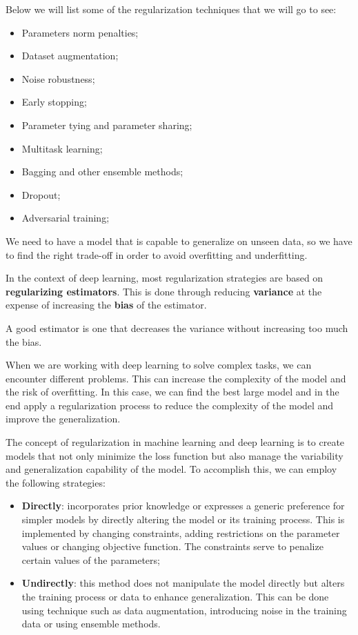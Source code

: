 Below we will list some of the regularization techniques that we will go to see:
\begin{itemize}
    \item Parameters norm penalties;
    \item Dataset augmentation;
    \item Noise robustness;
    \item Early stopping;
    \item Parameter tying and parameter sharing;
    \item Multitask learning;
    \item Bagging and other ensemble methods;
    \item Dropout;
    \item Adversarial training;
\end{itemize}

We need to have a model that is capable to generalize on unseen data, so we have
to find the right trade-off in order to avoid overfitting and underfitting.

In the context of deep learning, most regularization strategies are based on
\textbf{regularizing estimators}. This is done through reducing \textbf{variance}
at the expense of increasing the \textbf{bias} of the estimator.
\begin{note}
    A good estimator is one that decreases the variance without increasing too
    much the bias.
\end{note}

When we are working with deep learning to solve complex tasks, we can encounter
different problems. This can increase the complexity of the model and the risk of
overfitting. In this case, we can find the best large model and in the end apply
a regularization process to reduce the complexity of the model and improve the
generalization.

The concept of regularization in machine learning and deep learning is to create
models that not only minimize the loss function but also manage the variability
and generalization capability of the model. To accomplish this, we can employ the
following strategies:
\begin{itemize}
    \item \textbf{Directly}: incorporates prior knowledge or expresses a generic
          preference for simpler models by directly altering the model or its
          training process. This is implemented by changing constraints, adding
          restrictions on the parameter values or changing objective function.
          The constraints serve to penalize certain values of the parameters;
    \item \textbf{Undirectly}: this method does not manipulate the model directly
          but alters the training process or data to enhance generalization. This
          can be done using technique such as data augmentation, introducing noise
          in the training data or using ensemble methods.
\end{itemize}
